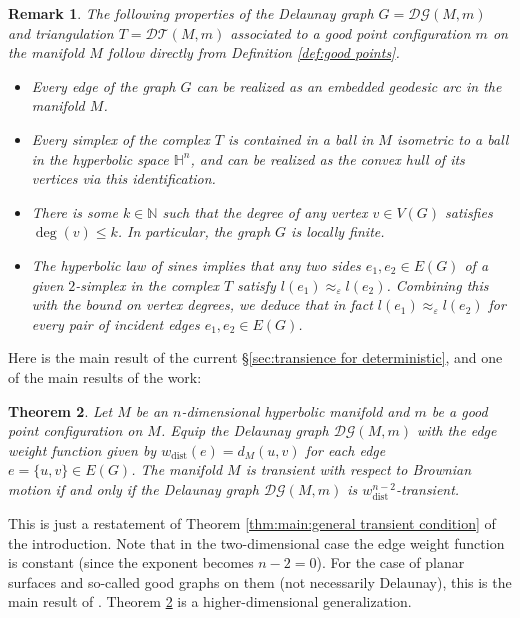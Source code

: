 \documentclass{amsart}
\newcommand{\NN}{\mathbb{N}}
\newcommand{\DelanGraph}{\mathcal{DG}}
\newcommand{\DelanComplex}{\mathcal{DT}}
\theoremstyle{plain}
\newtheorem{theorem}{Theorem}[section]
\newtheorem{remark}[theorem]{Remark}
\numberwithin{equation}{section}
\theoremstyle{definition}
\begin{document}


\begin{remark}    \label{remark:properties of good}
The following properties of the Delaunay graph $G = \DelanGraph(M,m)$ and triangulation $T = \DelanComplex(M,m)$ associated to a \emph{good} point configuration $m$ on the manifold $M$ follow directly from Definition \ref{def:good points}.
\begin{itemize}
    \item Every edge of the graph $G$ can be realized as an embedded geodesic arc in  the manifold $M$.
    \item \label{good:simplex}
    Every simplex of the complex $T$ is contained in a ball in $M$ isometric to a ball in the hyperbolic space $\mathbb{H}^n$, and can be realized as the convex hull of its vertices via this identification.
    \item There is some $k \in \NN$ such that the degree  of any vertex  $v \in V(G)$ satisfies $\deg (v) \le k$. In particular, the graph $G$ is locally finite.
    \item The hyperbolic law of sines implies that any two sides $e_1,e_2 \in E(G)$ of a given $2$-simplex in the complex $T$ satisfy $l(e_1) \approx _\varepsilon l(e_2)$. Combining this with the bound on vertex degrees, we deduce that in fact $l(e_1) \approx _\varepsilon l(e_2)$ for every pair of incident edges $e_1,e_2 \in E(G)$.
\end{itemize}
\end{remark}

Here is the main result of the current \S\ref{sec:transience for deterministic}, and one of the main results of the work:

\begin{theorem}
\label{thm:transience passes to good graphs}
Let $M$ be an $n$-dimensional hyperbolic manifold and $m$ be a good point configuration on $M$. Equip
the Delaunay graph $\DelanGraph (M,m)$ with the edge weight function given by $w_\mathrm{dist}(e) = d_M(u,v)$ for each edge $e = \{u,v\} \in E(G)$. 
The manifold $M$ is transient with respect to Brownian motion if and only if the Delaunay graph $\DelanGraph (M,m)$ is $w_{\mathrm{dist}}^{n-2}$-transient.
\end{theorem}

This is just a restatement of Theorem \ref{thm:main:general transient condition} of the introduction. Note that in the two-dimensional case the edge weight function is constant (since the exponent becomes $n-2=0$).
For the case of planar surfaces and so-called good graphs on them (not necessarily Delaunay), this is the main result of \cite{gurel2017recurrence}. Theorem \ref{thm:transience passes to good graphs} is a higher-dimensional generalization. 
\end{document}
